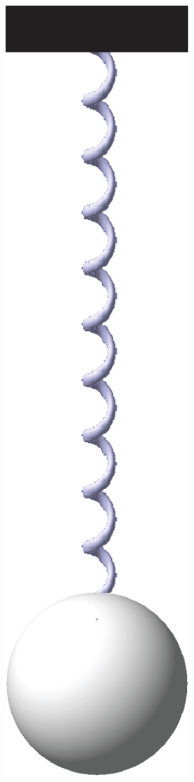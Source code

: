 \documentclass[12pt,letterpaper,twoside]{amsart}
\begin{document}
\begin{center}
\includegraphics[width=3in]{springmass1.eps}
\end{center}
\end{document}
